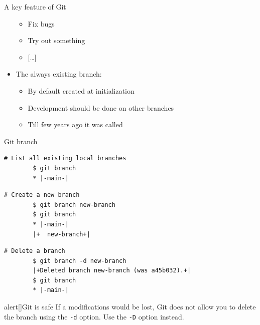 \documentclass[usenames,svgnames,14pt]{beamer}
\begin{document}
\begin{frame}[label=current]{A key feature of Git}
\begin{overlayarea}{\textwidth}{0.7\textheight}
\begin{itemize}
\begin{itemize}
                      \item Fix bugs
                      \item Try out something
                      \item {}[\ldots]
                  \end{itemize}
            \item<2-> The always existing \;\; branch:
                  \begin{itemize}
                      \item By default created at initialization
                      \item Development should be done on other branches
                      \item Till few years ago it was called \;
                  \end{itemize}
        \end{itemize}
    \end{overlayarea}
\end{frame}
\begin{frame}[fragile]{Git branch}
    \begin{lstlisting}[style=MyBash]
        # List all existing local branches
        $ git branch
        * |-main-|
    \end{lstlisting}
    \begin{lstlisting}[style=MyBash]
        # Create a new branch
        $ git branch new-branch
        $ git branch
        * |-main-|
        |+  new-branch+|
    \end{lstlisting}
    \begin{lstlisting}[style=MyBash]
        # Delete a branch
        $ git branch -d new-branch
        |+Deleted branch new-branch (was a45b032).+|
        $ git branch
        * |-main-|
    \end{lstlisting}
    \begin{varblock}{alert}[\textwidth]{Git is safe}
        \small
        If a modifications would be lost, Git does not allow you to delete the branch using the \texttt{-d} option.
        Use the \texttt{-D} option instead.
    \end{varblock}
\end{frame}
\end{document}

